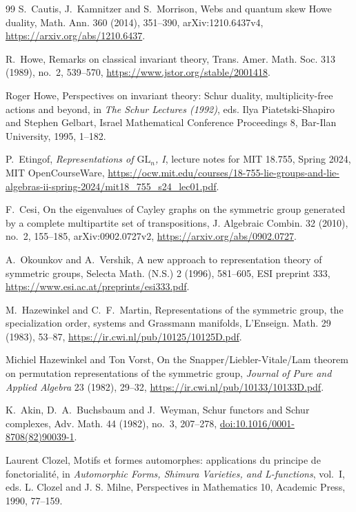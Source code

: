 \documentclass[11pt]{amsart}
\theoremstyle{definition}
\theoremstyle{remark}
\begin{document}
\begin{thebibliography}{99}
S.~Cautis, J.~Kamnitzer and S.~Morrison, Webs and quantum skew Howe duality,
Math. Ann. 360 (2014), 351--390, arXiv:1210.6437v4,
\url{https://arxiv.org/abs/1210.6437}.

R.~Howe, Remarks on classical invariant theory,
Trans. Amer. Math. Soc. 313 (1989), no.~2, 539--570,
\url{https://www.jstor.org/stable/2001418}.

Roger Howe, Perspectives on invariant theory: Schur duality, multiplicity-free
actions and beyond, in \emph{The Schur Lectures (1992)}, eds. Ilya
Piatetski-Shapiro and Stephen Gelbart, Israel Mathematical Conference
Proceedings 8, Bar-Ilan University, 1995, 1--182.

P.~Etingof, \emph{Representations of \(\mathrm{GL}_n\), I}, lecture notes for
MIT 18.755, Spring 2024, MIT OpenCourseWare,
\url{https://ocw.mit.edu/courses/18-755-lie-groups-and-lie-algebras-ii-spring-2024/mit18_755_s24_lec01.pdf}.

F.~Cesi, On the eigenvalues of Cayley graphs on the symmetric group generated
by a complete multipartite set of transpositions,
J. Algebraic Combin. 32 (2010), no.~2, 155--185, arXiv:0902.0727v2,
\url{https://arxiv.org/abs/0902.0727}.

A.~Okounkov and A.~Vershik, A new approach to representation theory of
symmetric groups, Selecta Math. (N.S.) 2 (1996), 581--605, ESI preprint 333,
\url{https://www.esi.ac.at/preprints/esi333.pdf}.

M.~Hazewinkel and C.~F.~Martin, Representations of the symmetric group,
the specialization order, systems and Grassmann manifolds,
L'Enseign. Math. 29 (1983), 53--87, \url{https://ir.cwi.nl/pub/10125/10125D.pdf}.

Michiel Hazewinkel and Ton Vorst, On the Snapper/Liebler-Vitale/Lam
theorem on permutation representations of the symmetric group,
\emph{Journal of Pure and Applied Algebra} 23 (1982), 29--32,
\url{https://ir.cwi.nl/pub/10133/10133D.pdf}.

K.~Akin, D.~A.~Buchsbaum and J.~Weyman, Schur functors and Schur complexes,
Adv. Math. 44 (1982), no.~3, 207--278,
\href{https://doi.org/10.1016/0001-8708(82)90039-1}{doi:10.1016/0001-8708(82)90039-1}.

Laurent Clozel, Motifs et formes automorphes: applications du principe de
fonctorialit\'e, in \emph{Automorphic Forms, Shimura Varieties, and
L-functions}, vol.~I, eds. L. Clozel and J. S. Milne, Perspectives in
Mathematics 10, Academic Press, 1990, 77--159.


\end{thebibliography}
\end{document}
